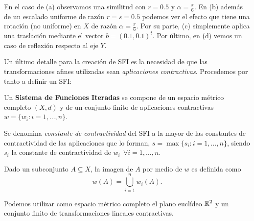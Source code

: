 En el caso de (a) observamos una similitud con $r=0.5$ y $\alpha=\frac{\pi}{6}$. En (b) además de un escalado uniforme de razón $r=s=0.5$ podemos ver el efecto que tiene una rotación (no uniforme) en $X$ de razón $\alpha=\frac{\pi}{6}$. Por su parte, (c) simplemente aplica una traslación mediante el vector $b=(0.1,0.1)^t$. Por último, en (d) vemos un caso de reflexión respecto al eje $Y$.

Un último detalle para la creación de SFI es la necesidad de que las transformaciones afines utilizadas sean \textit{aplicaciones contractivas}. Procedemos por tanto a definir un SFI:

\begin{definicion}
    \label{def:SFI}
    Un \textbf{Sistema de Funciones Iteradas} se compone de un espacio métrico completo $(X,d)$ y de un conjunto finito de aplicaciones contractivas $w=\{w_i:i=1,\dots,n\}$.

    Se denomina \textit{constante de contractividad} del SFI a la mayor de las constantes de contractividad de las aplicaciones que lo forman, $s=\max\{s_i:i=1,\dots,n\}$, siendo $s_i$ la constante de contractividad de $w_i \ \ \forall i=1,\dots,n$.

    Dado un subconjunto $A\subseteq X$, la imagen de $A$ por medio de $w$ es definida como
    $$
    w(A)=\bigcup_{i=1}^n w_i(A).
    $$
\end{definicion}

Podemos utilizar como espacio métrico completo el plano euclídeo $\mathbb{R}^2$ y un conjunto finito de transformaciones lineales contractivas.

